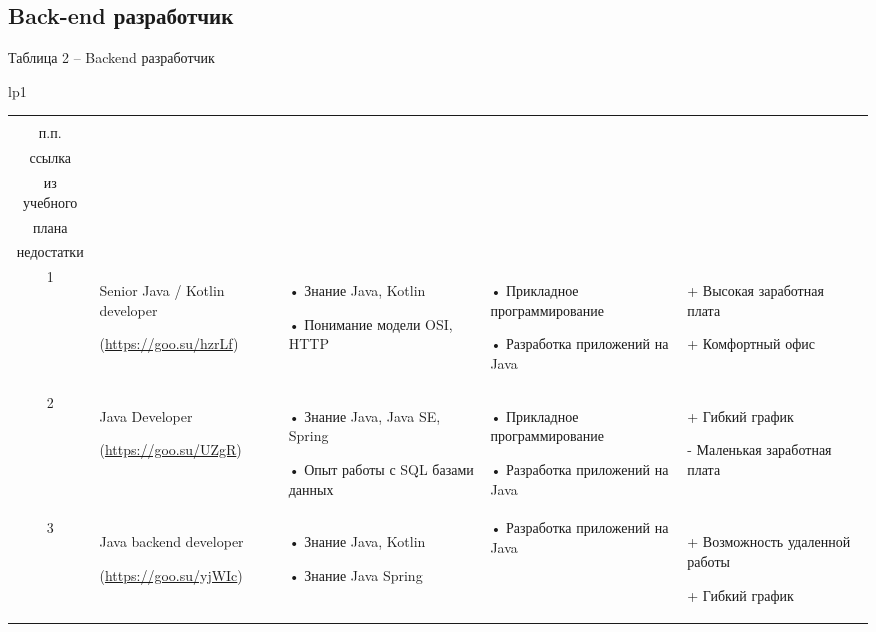 \documentclass[14pt]{extreport}
\begin{document}
\begin{landscape}
\newpage
\section{Back-end разработчик}
Таблица 2 – Backend разработчик
\begin{longtable}[H]{lp{1\linewidth}}

\caption{Backend разработчик}


\centering

\begin{small}


    \begin{tabular}{|c|p{}|p{6cm}|p{5cm}|p{5cm}|}
	\hline 
	\makecell{№ \\ п.п.} &	\makecell{Название должности,\\ ссылка} &	\makecell{Требования} & 	\makecell{Дисциплины \\ из учебного \\плана} &	\makecell{Преимущества и \\недостатки}  \\ 
	\hline 
	1	& Senior Java / Kotlin developer
	
(\url{https://goo.su/hzrLf}) &
•	Знание Java, Kotlin

•	Понимание модели OSI, HTTP &
•	Прикладное программирование

•	Разработка приложений на Java &
+	Высокая заработная плата


+	Комфортный офис

 \\

	\hline
	2	& Java Developer
	
(\url{https://goo.su/UZgR}) &
•	Знание Java, Java SE, Spring

•	Опыт работы с SQL базами данных

&

•	Прикладное программирование

•	Разработка приложений на Java &
+	Гибкий график


-	Маленькая заработная плата\\
	\hline 
	3	& Java backend developer
	
(\url{https://goo.su/yjWIc}) &
•	Знание Java, Kotlin

•	Знание Java Spring &

•	Разработка приложений на Java &
+	Возможность удаленной работы

+	Гибкий график
 \\


	\hline



\end{tabular}
\end{small}
\end{longtable}
\end{landscape}
\end{document}
